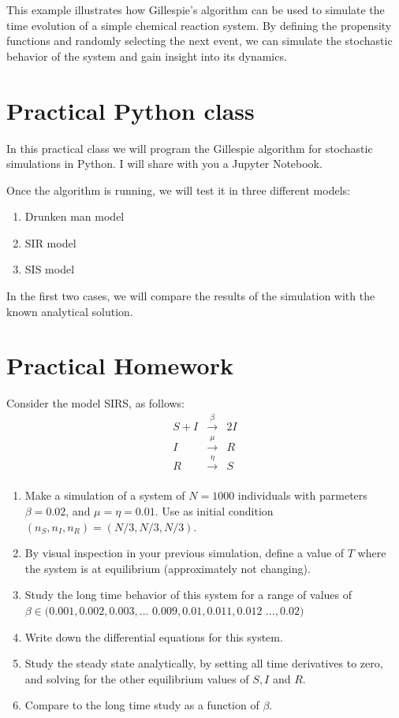 This example illustrates how Gillespie's algorithm can be used to simulate the time evolution of a simple chemical reaction system. By defining the propensity functions and randomly selecting the next event, we can simulate the stochastic behavior of the system and gain insight into its dynamics.


\section{Practical Python class}

In this practical class we will program the Gillespie algorithm for stochastic simulations in Python. I will share with you a Jupyter Notebook.

Once the algorithm is running, we will test it in three different models:
\begin{enumerate}
 \item Drunken man model
 \item SIR model
 \item SIS model
\end{enumerate}

In the first two cases, we will compare the results of the simulation with the known analytical solution.



\section{Practical Homework}

Consider the model SIRS, as follows:
\begin{eqnarray*}
 S + I &\xrightarrow{\beta}& 2I \\
 I &\xrightarrow{\mu}& R \\
 R &\xrightarrow{\eta}& S \\
\end{eqnarray*}

\begin{enumerate}
 \item Make a simulation of a system of $N=1000$ individuals with parmeters $\beta = 0.02$, and $\mu=\eta=0.01$. Use as initial condition $(n_S,n_I,n_R) = (N/3,N/3,N/3)$.
 \item By visual inspection in your previous simulation, define a value of $T$ where the system is at equilibrium (approximately not changing).
 \item Study the long time behavior of this system for a range of values of $\beta \in (0.001,0.002,0.003,\ldots$ $0.009,0.01,0.011,0.012$ $\ldots,0.02)$
 \item Write down the differential equations for this system.
 \item Study the steady state analytically, by setting all time derivatives to zero, and solving for the other equilibrium values of $S,I$ and $R$.
 \item Compare to the long time study as a function of $\beta$.
\end{enumerate}
 



